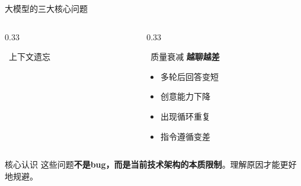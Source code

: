 \documentclass[aspectratio=169,11pt]{beamer}
\begin{document}
\begin{frame}{大模型的三大核心问题}
\begin{columns}
\begin{column}{0.33\textwidth}
\begin{alertblock}{\faMemory\ 上下文遗忘}
            \end{alertblock}
        \end{column}
        \begin{column}{0.33\textwidth}
            \begin{alertblock}{\faChartLine\ 质量衰减}
                \centering
                \vspace{0.2cm}
                \textbf{越聊越差}
                \vspace{0.2cm}
                \begin{itemize}
                    \item 多轮后回答变短
                    \item 创意能力下降
                    \item 出现循环重复
                    \item 指令遵循变差
                \end{itemize}
            \end{alertblock}
        \end{column}
    \end{columns}
    
    \vspace{0.5cm}
    \begin{block}{核心认识}
        \centering
        这些问题\textbf{不是bug，而是当前技术架构的本质限制}。理解原因才能更好地规避。
    \end{block}
\end{frame}
\end{document}
